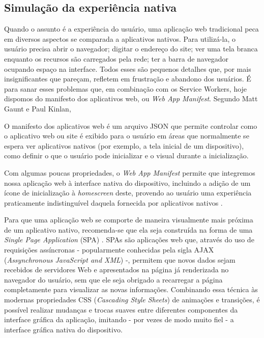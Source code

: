 \documentclass[
	article,			%
	11pt,				%
	oneside,			%
	a4paper,			%
	english,			%
	brazil,				%
	sumario=tradicional
	]{abntex2}
\begin{document}
\subsection{Simulação da experiência nativa}

Quando o assunto é a experiência do usuário, uma aplicação web tradicional peca em diversos aspectos se comparada a aplicativos nativos. Para utilizá-la, o usuário precisa abrir o navegador; digitar o endereço do site; ver uma tela branca enquanto os recursos são carregados pela rede; ter a barra de navegador ocupando espaço na interface. Todos esses são pequenos detalhes que, por mais insignificantes que pareçam, refletem em frustração e abandono dos usuários. É para sanar esses problemas que, em combinação com os Service Workers, hoje dispomos do manifesto dos aplicativos web, ou \textit{Web App Manifest}. Segundo Matt Gaunt e Paul Kinlan,

\begin{citacao}
	O manifesto dos aplicativos web é um arquivo JSON que permite controlar como o aplicativo web ou site é exibido para o usuário em áreas que normalmente se espera ver aplicativos nativos (por exemplo, a tela inicial de um dispositivo), como definir o que o usuário pode inicializar e o visual durante a inicialização. \cite{gaunt-kinlan-2017}
\end{citacao}

Com algumas poucas propriedades, o \textit{Web App Manifest} permite que integremos nossa aplicação web à interface nativa do dispositivo, incluindo a adição de um ícone de inicialização à \textit{homescreen} deste, provendo ao usuário uma experiência praticamente indistinguível daquela fornecida por aplicativos nativos \cite{lopes-2016}.

Para que uma aplicação web se comporte de maneira visualmente mais próxima de um aplicativo nativo, recomenda-se que ela seja construída na forma de uma \textit{Single Page Application} (SPA) \cite{lopes-2016}. SPAs são aplicações web que, através do uso de requisições assíncronas - popularmente conhecidas pela sigla AJAX (\textit{Assynchronous JavaScript and XML}) -, permitem que novos dados sejam recebidos de servidores Web e apresentados na página já renderizada no navegador do usuário, sem que ele seja obrigado a recarregar a página completamente para visualizar as novas informações. Combinando essa técnica às modernas propriedades CSS (\textit{Cascading Style Sheets}) de animações e transições, é possível realizar mudanças e trocas suaves entre diferentes componentes da interface gráfica da aplicação, imitando - por vezes de modo muito fiel - a interface gráfica nativa do dispositivo.
\end{document}
